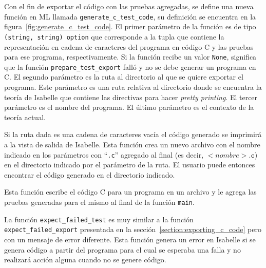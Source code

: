 Con el fin de exportar el código con las pruebas agregadas, se define una nueva función en ML llamada \verb|generate_c_test_code|, su definición se encuentra en la figura~\ref{fig:generate_c_test_code}.
El primer parámetro de la función es de tipo \verb|(string, string) option| que corresponde a la tupla que contiene la representación en cadena de caracteres del programa en código C y las pruebas para ese programa, respectivamente.
Si la función recibe un valor \verb|None|, significa que la función \verb|prepare_test_export| falló y no se debe generar un programa en C.
El segundo parámetro es la ruta al directorio al que se quiere exportar el programa.
Este parámetro es una ruta relativa al directorio donde se encuentra la teoría de Isabelle que contiene las directivas para hacer \textit{pretty printing}.
El tercer parámetro es el nombre del programa.
El último parámetro es el contexto de la teoría actual.

Si la ruta dada es una cadena de caracteres vacía el código generado se imprimirá a la vista de salida de Isabelle.
Esta función crea un nuevo archivo con el nombre indicado en los parámetros con ``\verb|.c|'' agregado al final (es decir, $<nombre>\mathtt{.c}$) en el directorio indicado por el parámetro de la ruta.
El usuario puede entonces encontrar el código generado en el directorio indicado.

Esta función escribe el código C para un programa en un archivo y le agrega las pruebas generadas para el mismo al final de la función \verb|main|.

La función \verb|expect_failed_test| es muy similar a la función \verb|expect_failed_export| presentada en la sección~\ref{section:exporting_c_code} pero con un mensaje de error diferente.
Esta función genera un error en Isabelle si se genera código a partir del programa para el cual se esperaba una falla y no realizará acción alguna cuando no se genere código.

